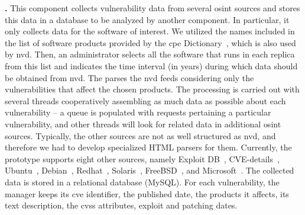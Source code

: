  \textbf{\fetcher.} 
This component collects vulnerability data from several \gls{osint} sources and stores this data in a database to be analyzed by another \system component.
In particular, it only collects data for the software of interest.
We utilized the names included in the list of software products provided by the \gls{cpe} Dictionary~\cite{cpe}, which is also used by \gls{nvd}. 
Then, an administrator selects all the software that runs in each replica from this list and indicates the time interval (in years) during which data should be obtained from \gls{nvd}.
The \fetcher parses the \gls{nvd} feeds considering only the vulnerabilities that affect the chosen products. 
The processing is carried out with several threads cooperatively assembling as much data as possible about each vulnerability -- a queue is populated with requests pertaining a particular vulnerability, and other threads will look for related data in additional \gls{osint} sources. 
Typically, the other sources are not as well structured as \gls{nvd}, and therefore we had to develop specialized HTML parsers for them. 
Currently, the prototype supports eight other sources, namely Exploit DB~\cite{edb}, CVE-details~\cite{cvedetails}, Ubuntu~\cite{ubuntu}, Debian~\cite{debian}, Redhat~\cite{redhat}, Solaris~\cite{solaris}, FreeBSD~\cite{freebsd}, and Microsoft~\cite{microsoft}. 
The collected data is stored in a relational database (MySQL).
For each vulnerability, the manager keeps its \gls{cve} identifier, the published date, the products it affects, its text description, the \gls{cvss} attributes, exploit and patching dates.


